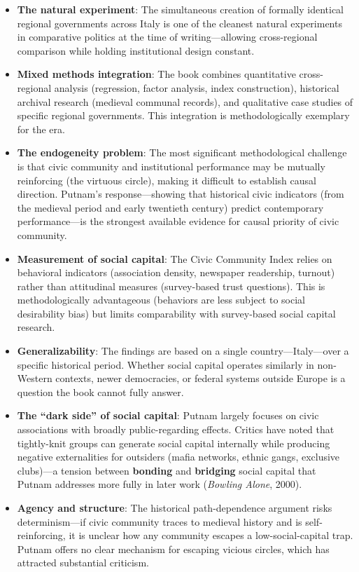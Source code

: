 \documentclass[12pt]{article}
\begin{document}
\begin{itemize}[leftmargin=*, itemsep=4pt]
\begin{itemize}[leftmargin=*, itemsep=4pt]
    \item \textbf{The natural experiment}: The simultaneous creation of formally identical regional governments across Italy is one of the cleanest natural experiments in comparative politics at the time of writing---allowing cross-regional comparison while holding institutional design constant.
    \item \textbf{Mixed methods integration}: The book combines quantitative cross-regional analysis (regression, factor analysis, index construction), historical archival research (medieval communal records), and qualitative case studies of specific regional governments. This integration is methodologically exemplary for the era.
    \item \textbf{The endogeneity problem}: The most significant methodological challenge is that civic community and institutional performance may be mutually reinforcing (the virtuous circle), making it difficult to establish causal direction. Putnam's response---showing that historical civic indicators (from the medieval period and early twentieth century) predict contemporary performance---is the strongest available evidence for causal priority of civic community.
    \item \textbf{Measurement of social capital}: The Civic Community Index relies on behavioral indicators (association density, newspaper readership, turnout) rather than attitudinal measures (survey-based trust questions). This is methodologically advantageous (behaviors are less subject to social desirability bias) but limits comparability with survey-based social capital research.
    \item \textbf{Generalizability}: The findings are based on a single country---Italy---over a specific historical period. Whether social capital operates similarly in non-Western contexts, newer democracies, or federal systems outside Europe is a question the book cannot fully answer.
    \item \textbf{The ``dark side'' of social capital}: Putnam largely focuses on civic associations with broadly public-regarding effects. Critics have noted that tightly-knit groups can generate social capital internally while producing negative externalities for outsiders (mafia networks, ethnic gangs, exclusive clubs)---a tension between \textbf{bonding} and \textbf{bridging} social capital that Putnam addresses more fully in later work (\textit{Bowling Alone}, 2000).
    \item \textbf{Agency and structure}: The historical path-dependence argument risks determinism---if civic community traces to medieval history and is self-reinforcing, it is unclear how any community escapes a low-social-capital trap. Putnam offers no clear mechanism for escaping vicious circles, which has attracted substantial criticism.
\end{itemize}


\end{itemize}
\end{document}
